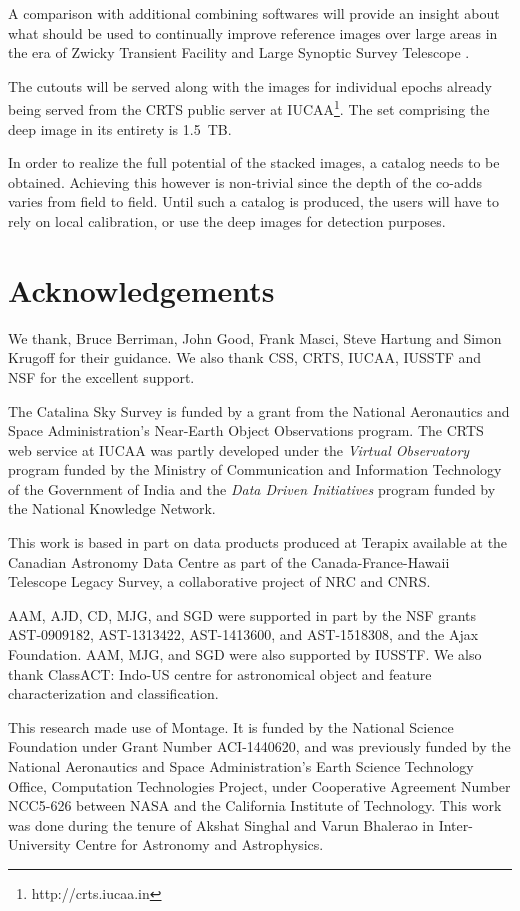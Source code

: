 \documentclass[fleqn,usenatbib]{mnras}
\begin{document}
A comparison with additional combining softwares will provide an insight about what should be used to continually improve reference images over large areas in the era of Zwicky Transient Facility \citep[ZTF;][]{bellm14} and Large Synoptic Survey Telescope \citep[LSST;][]{LSSTSciBook2009}.

The cutouts will be served along with the images for individual epochs already being served from the CRTS public server at IUCAA\footnote{http://crts.iucaa.in}. The set comprising the deep image in its entirety is 1.5~TB.

In order to realize the full potential of the stacked images, a catalog needs to be obtained. Achieving this however is non-trivial since the depth of the co-adds varies from field to field. Until such a catalog is produced, the users will have to rely on local calibration, or use the deep images for detection purposes.



\section*{Acknowledgements}

We thank, Bruce Berriman, John Good, Frank Masci, Steve Hartung and Simon Krugoff for their guidance.  We also thank CSS, CRTS, IUCAA, IUSSTF and NSF for the excellent support.

The Catalina Sky Survey is funded by a grant from the National Aeronautics and Space Administration’s Near-Earth Object Observations program. The CRTS web service at IUCAA was partly developed under the \textit{Virtual Observatory} program funded by the Ministry of Communication and Information Technology of the Government of India and the \textit{Data Driven Initiatives} program funded by the National Knowledge Network.

This work is based in part on data products produced at Terapix available at the Canadian Astronomy Data Centre as part of the Canada-France-Hawaii Telescope Legacy Survey, a collaborative project of NRC and CNRS.

AAM, AJD, CD, MJG, and SGD were supported in part by the NSF grants AST-0909182, AST-1313422, AST-1413600, and AST-1518308, and the Ajax Foundation. AAM, MJG, and SGD were also supported by IUSSTF. We also thank ClassACT: Indo-US centre for astronomical object and feature characterization and classification.

This research made use of Montage. It is funded by the National Science Foundation under Grant Number ACI-1440620, and was previously funded by the National Aeronautics and Space Administration's Earth Science Technology Office, Computation Technologies Project, under Cooperative Agreement Number NCC5-626 between NASA and the California Institute of Technology. 
This work was done during the tenure of Akshat Singhal and Varun Bhalerao in Inter-University Centre for Astronomy and Astrophysics.
\end{document}
